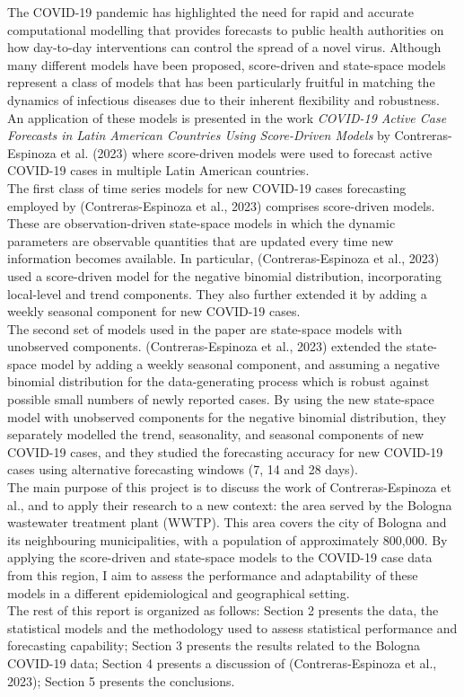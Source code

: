 The COVID-19 pandemic has highlighted the need for rapid and accurate computational modelling that provides forecasts to public health authorities on how day-to-day interventions can control the spread of a novel virus. Although many different models have been proposed, score-driven and state-space models represent a class of models that has been particularly fruitful in matching the dynamics of infectious diseases due to their inherent flexibility and robustness. An application of these models is presented in the work \textit{COVID-19 Active Case Forecasts in Latin American Countries Using Score-Driven Models} by Contreras-Espinoza et al. (2023) where score-driven models were used to forecast active COVID-19 cases in multiple Latin American countries.\\

The first class of time series models for new COVID-19 cases forecasting employed by (Contreras-Espinoza et al., 2023) comprises score-driven models. These are observation-driven state-space models in which the dynamic parameters are observable quantities that are updated every time new information becomes available. In particular, (Contreras-Espinoza et al., 2023) used a score-driven model for the negative binomial distribution, incorporating local-level and trend components. They also further extended it by adding a weekly seasonal component for new COVID-19 cases. \\

The second set of models used in the paper are state-space models with unobserved components. (Contreras-Espinoza et al., 2023) extended the state-space model by adding a weekly seasonal component, and assuming a negative binomial distribution for the data-generating process which is robust against possible small numbers of newly reported cases. By using the new state-space model with unobserved components for the negative binomial distribution, they separately modelled the trend, seasonality, and seasonal components of new COVID-19 cases, and they studied the forecasting accuracy for new COVID-19 cases using alternative forecasting windows (7, 14 and 28 days). \\

The main purpose of this project is to discuss the work of Contreras-Espinoza et al., and to apply their research to a new context: the area served by the Bologna wastewater treatment plant (WWTP). This area covers the city of Bologna and its neighbouring municipalities, with a population of approximately 800,000. By applying the score-driven and state-space models to the COVID-19 case data from this region, I aim to assess the performance and adaptability of these models in a different epidemiological and geographical setting. \\

The rest of this report is organized as follows: Section 2 presents the data, the statistical models and the methodology used to assess statistical performance and forecasting capability; Section 3 presents the results related to the Bologna COVID-19 data; Section 4 presents a discussion of (Contreras-Espinoza et al., 2023); Section 5 presents the conclusions.